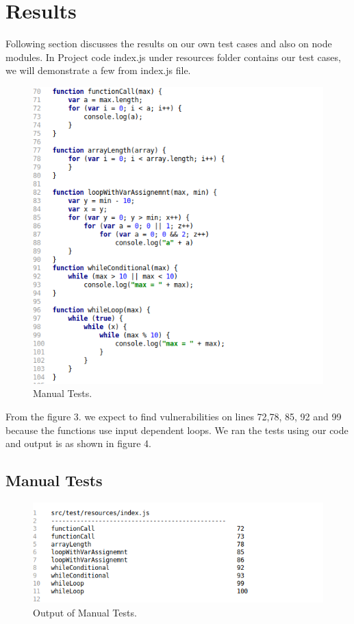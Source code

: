 \documentclass[authoryear,preprint]{sigplanconf}
\begin{document}
\section{Results}
Following section discusses the results on our own test cases and also on node modules.
In Project code index.js under resources folder contains our test cases, we will demonstrate a few from index.js file.

\begin{figure}[ht]
\centering
\includegraphics[width=1\linewidth]{figures/testcases}
\caption[Manual Tests]{\label{f:testcases}Manual Tests.}
\end{figure}

From the figure 3. we expect to find vulnerabilities on lines 72,78, 85, 92 and 99 because the functions use input dependent loops.
We ran the tests using our code and output is as shown in figure 4.
\subsection{Manual Tests}

\begin{figure}[ht]
\centering
\includegraphics[width=1\linewidth]{figures/output}
\caption[Output of Manual Tests]{\label{f:testcases}Output of Manual Tests.}
\end{figure}
\end{document}
